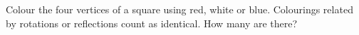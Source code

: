 Colour the four vertices of a square using red, white or blue. Colourings related by rotations or reflections count as identical. How many are there?
